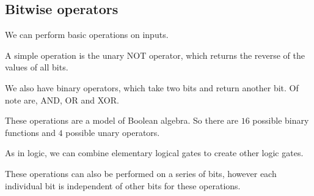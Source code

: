 
\subsection{Bitwise operators}

We can perform basic operations on inputs.

A simple operation is the unary NOT operator, which returns the reverse of the values of all bits.

We also have binary operators, which take two bits and return another bit. Of note are, AND, OR and XOR.

These operations are a model of Boolean algebra. So there are \(16\) possible binary functions and \(4\) possible unary operators.

As in logic, we can combine elementary logical gates to create other logic gates.

These operations can also be performed on a series of bits, however each individual bit is independent of other bits for these operations.

